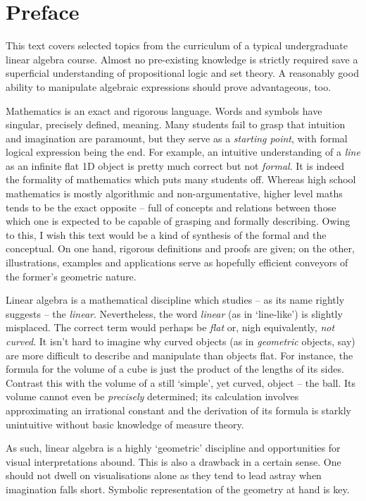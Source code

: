 \chapter*{Preface}

This text covers selected topics from the curriculum of a typical undergraduate
linear algebra course. Almost no pre-existing knowledge is strictly required
save a superficial understanding of propositional logic and set theory. A
reasonably good ability to manipulate algebraic expressions should prove
advantageous, too.

Mathematics is an exact and rigorous language. Words and symbols have singular,
precisely defined, meaning. Many students fail to grasp that intuition and
imagination are paramount, but they serve as a \emph{starting point}, with
formal logical expression being the end. For example, an intuitive understanding
of a \emph{line} as an infinite flat 1D object is pretty much correct but not
\emph{formal}. It is indeed the formality of mathematics which puts many
students off. Whereas high school mathematics is mostly algorithmic and
non-argumentative, higher level maths tends to be the exact opposite -- full of
concepts and relations between those which one is expected to be capable of
grasping and formally describing. Owing to this, I wish this text would be a
kind of synthesis of the formal and the conceptual. On one hand, rigorous
definitions and proofs are given; on the other, illustrations, examples and
applications serve as hopefully efficient conveyors of the former's geometric
nature.

Linear algebra is a mathematical discipline which studies -- as its name rightly
suggests -- the \emph{linear}. Nevertheless, the word \emph{linear} (as in
`line-like') is slightly misplaced. The correct term would perhaps be
\emph{flat} or, nigh equivalently, \emph{not curved}. It isn't hard to imagine
why curved objects (as in \emph{geometric} objects, say) are more difficult to
describe and manipulate than objects flat. For instance, the formula for the
volume of a cube is just the product of the lengths of its sides. Contrast this
with the volume of a still `simple', yet curved, object -- the ball. Its volume
cannot even be \emph{precisely} determined; its calculation involves
approximating an irrational constant and the derivation of its formula is
starkly unintuitive without basic knowledge of measure theory.

As such, linear algebra is a highly `geometric' discipline and opportunities for
visual interpretations abound. This is also a drawback in a certain sense. One
should not dwell on visualisations alone as they tend to lead astray when
imagination falls short. Symbolic representation of the geometry at hand is
key.

